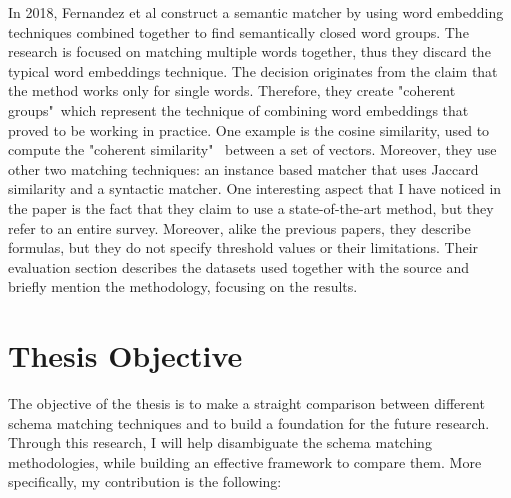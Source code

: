 \documentclass[a4paper]{article}
\begin{document}
In 2018, Fernandez et al \cite{fernandez2018seeping} construct a semantic matcher by using word embedding techniques combined together to find semantically closed word groups. The research is focused on matching multiple words together, thus they discard the typical word embeddings technique. The decision originates from the claim that the method works only for single words. Therefore, they create "coherent groups"\ which represent the technique of combining word embeddings that proved to be working in practice. One example is the cosine similarity, used to compute the "coherent similarity" \ between a set of vectors. Moreover, they use other two matching techniques: an instance based matcher that uses Jaccard similarity and a syntactic matcher. One interesting aspect that I have noticed in the paper is the fact that they claim to use a state-of-the-art method, but they refer to an entire survey. Moreover, alike the previous papers, they describe formulas, but they do not specify threshold values or their limitations. Their evaluation section describes the datasets used together with the source and briefly mention the methodology, focusing on the results. 


\section{Thesis Objective}

The objective of the thesis is to make a straight comparison between different schema matching techniques and to build a foundation for the future research. Through this research, I will help disambiguate the schema matching methodologies, while building an effective framework to compare them. More specifically, my contribution is the following: 
\end{document}
